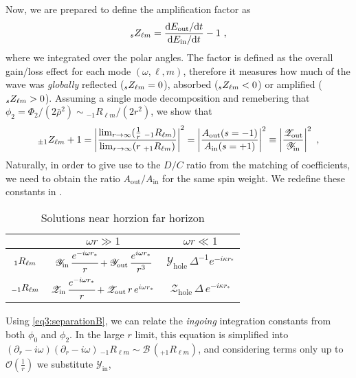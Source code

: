 Now, we are prepared to define the amplification factor as 
\begin{align}
    \label{eq3:Zdef}
    \uu[s]{Z}{\ell m} = \frac{\dd E_\mathrm{out} / \dd t}{\dd E_\mathrm{in} / \dd t} - 1 ~,
\end{align}
where we integrated over the polar angles.
The factor is defined as the overall gain/loss effect for each mode $(\omega,\ell,m)$, therefore it measures how much of the wave was \emph{globally} reflected ($\uu[s]{Z}{\ell m}=0$), absorbed ($\uu[s]{Z}{\ell m}<0$) or amplified ($\uu[s]{Z}{\ell m}>0$).
Assuming a single mode decomposition and remebering that $\phi_2 = \Phi_2/(2 \bar{\rho}^2) \sim {}_{-1}R_{\ell m}/(2 r^2)$, we show that
\begin{align}
    \label{eq3:ZfactorAout2Ain0}
    \uu[\pm1]{Z}{\ell m} +1= \left| \frac{\lim_{r\to\infty} (\tfrac{1}{r} \; {}_{-1}R_{\ell m} )}{\lim_{r\to\infty} ( r \; {}_{+1}R_{\ell m} )} \right|^2 = \left| \frac{A_\mathrm{out}(s=-1)}{A_\mathrm{in}(s=+1)} \right|^2 \equiv \left| \frac{\mathscr{Z}_\mathrm{out}}{\mathscr{Y}_\mathrm{in}} \right|^2 ~,
\end{align}
Naturally, in order to give use to the $D/C$ ratio from the matching of coefficients, we need to obtain the ratio $A_\mathrm{out}/A_\mathrm{in}$ for the same spin weight. We redefine these constants in .
\begin{table}[h]
	\centering
	\tabulinesep=1.5mm
    \begin{tabu}{@{\hskip 0.25cm}c@{\hskip 0.75cm}c@{\hskip 0.75cm}c@{\hskip 0.25cm}}
        \hline
         & $\omega r \gg 1$ & $\omega r \ll 1$ \\
		\hline\hline
        $\uu[1]{R}{\ell m}$ & $\mathscr{Y}_\mathrm{in}\,\cfrac{e^{-i \omega r_*}}{r} + \mathscr{Y}_\mathrm{out}\, \cfrac{e^{i \omega r_*}}{r^3}$ & $\mathscr{Y}_\mathrm{hole} \,\Delta^{-1} e^{-i \kappa r_{*}}$  \\
		\hline
        $\uu[-1]{R}{\ell m}$ & $\mathscr{Z}_\mathrm{in}\,\cfrac{e^{-i \omega r_*}}{r} + \mathscr{Z}_\mathrm{out}\, r \,e^{i \omega r_*}$ & $\mathscr{Z}_\mathrm{hole} \,\Delta \,e^{-i \kappa r_{*}}$ \\
        \hline
    \end{tabu}
    \caption{Solutions near horzion far horizon \cite{Teukolsky1974}}
    \label{tb3:approximatedRsolutionsYZ}
\end{table}
Using \eqref{eq3:separationB}, we can relate the \emph{ingoing} integration constants from both $\phi_0$ and $\phi_2$.
In the large $r$ limit, this equation is simplified into $(\partial_r-i \omega)(\partial_r-i \omega) \,{}_{-1}R_{\ell m} \sim \mathscr{B} \,( {}_{+1}R_{\ell m} )$, and considering terms only up to $\mathscr{O}(\tfrac{1}{r})$ we substitute $\mathscr{Y}_\mathrm{in}$,
